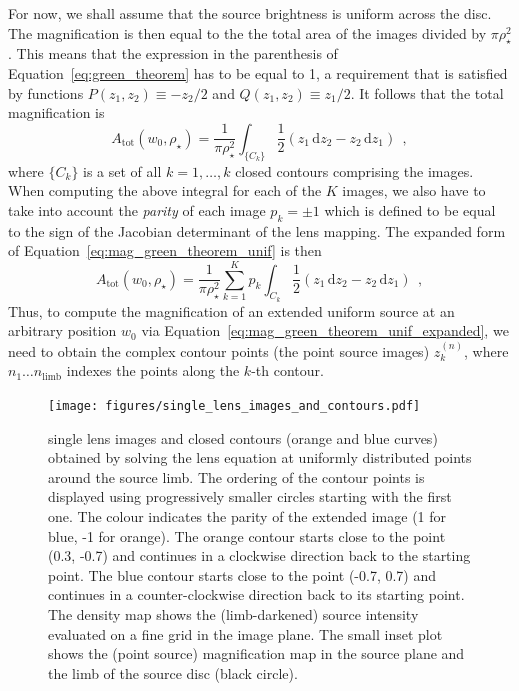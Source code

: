 \documentclass[12pt,dvipsnames]{report}
\newcommand{\ud}{\,\mathrm{d}}
\newcommand{\hquad}{~~}
\begin{document}
For now, we shall assume that the source brightness is uniform across the disc. 
The magnification is then  equal to the the total area of the images
divided by $\pi\rho_\star^2$. This means that the expression in the parenthesis
of Equation~\ref{eq:green_theorem} has to be equal to 1, a requirement that is 
satisfied by functions $P(z_1, z_2)\equiv -z_2/2$ and $Q(z_1, z_2)\equiv
    z_1/2$. It follows that the total magnification is
\begin{equation}
    A_\mathrm{tot}\left(w_0, \rho_{\star}\right)=\frac{1}{\pi \rho_{\star}^{2}}
    \int_{\{C_k\}} \frac{1}{2}(z_{1} \ud z_{2}-z_{2} \ud z_{1})
    \hquad ,
    \label{eq:mag_green_theorem_unif}
\end{equation}
where $\{C_k\}$ is a set of all $k=1,\dots,k$ closed contours comprising the images.
When computing the  above integral for each of the $K$ images, we also have to
take into account the \emph{parity} of each image $p_k=\pm 1$ which is defined to
be equal to the sign of the Jacobian determinant of the lens mapping. The expanded
form of Equation~\ref{eq:mag_green_theorem_unif} is then
\begin{equation}
    A_\mathrm{tot}\left(w_0, \rho_{\star}\right)=\frac{1}{\pi \rho_{\star}^{2}}
    \sum_{k=1}^Kp_k\int_{C_k} \frac{1}{2}(z_{1} \ud z_{2}-z_{2} \ud z_{1})
    \hquad ,
    \label{eq:mag_green_theorem_unif_expanded}
\end{equation}
Thus, to compute the magnification of an extended uniform source at an arbitrary 
position $w_0$ via Equation~\ref{eq:mag_green_theorem_unif_expanded}, we need
to obtain the complex contour points (the point source images) $z_k^{(n)}$, where $n_1\dots
    n_\mathrm{limb}$ indexes the points along the $k$-th contour. 

\begin{figure}[t]
    \begin{centering}
        \texttt{[image: figures/single\_lens\_images\_and\_contours.pdf]}
        \caption{
            single lens images and closed contours (orange and blue curves) obtained by 
            solving the lens equation at uniformly distributed points around the source limb.
            The ordering of the contour points is displayed using progressively smaller 
            circles starting with the first one. The colour indicates
            the parity of the extended image (1 for blue, -1 for orange).
            The orange contour starts close to the point (0.3, -0.7) and continues in 
            a clockwise direction back to the starting point. The blue contour starts 
            close to the point (-0.7, 0.7) and continues in a counter-clockwise direction 
            back to its starting point. The density map shows the (limb-darkened) source
            intensity evaluated on a fine grid in the image plane. The small
            inset plot shows the (point source) magnification map in the source plane
            and the limb of the source disc (black circle).
        }
        \label{fig:single_lens_images_and_contours}
    \end{centering}
\end{figure}
\end{document}
